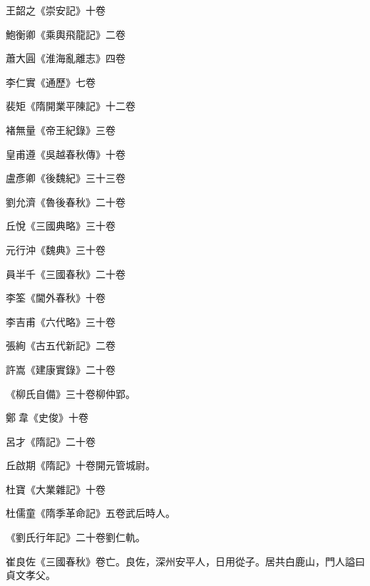 \begin{pinyinscope}
 王韶之《崇安記》十卷



 鮑衡卿《乘輿飛龍記》二卷



 蕭大圓《淮海亂離志》四卷



 李仁實《通歷》七卷



 裴矩《隋開業平陳記》十二卷



 褚無量《帝王紀錄》三卷



 皇甫遵《吳越春秋傳》十卷



 盧彥卿《後魏紀》三十三卷



 劉允濟《魯後春秋》二十卷



 丘悅《三國典略》三十卷



 元行沖《魏典》三十卷



 員半千《三國春秋》二十卷



 李筌《閫外春秋》十卷



 李吉甫《六代略》三十卷



 張絢《古五代新記》二卷



 許嵩《建康實錄》二十卷



 《柳氏自備》三十卷柳仲郢。



 鄭韋《史俊》十卷



 呂才《隋記》二十卷



 丘啟期《隋記》十卷開元管城尉。



 杜寶《大業雜記》十卷



 杜儒童《隋季革命記》五卷武后時人。



 《劉氏行年記》二十卷劉仁軌。



 崔良佐《三國春秋》卷亡。良佐，深州安平人，日用從子。居共白鹿山，門人謚曰貞文孝父。




\end{pinyinscope}
